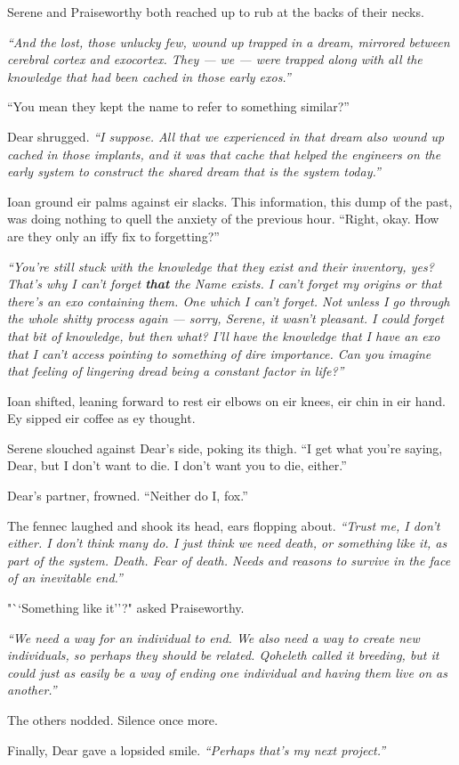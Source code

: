 Serene and Praiseworthy both reached up to rub at the backs of their necks.

\emph{``And the lost, those unlucky few, wound up trapped in a dream, mirrored between cerebral cortex and exocortex. They — we — were trapped along with all the knowledge that had been cached in those early exos.''}

``You mean they kept the name to refer to something similar?''

Dear shrugged. \emph{``I suppose. All that we experienced in that dream also wound up cached in those implants, and it was that cache that helped the engineers on the early system to construct the shared dream that is the system today.''}

Ioan ground eir palms against eir slacks. This information, this dump of the past, was doing nothing to quell the anxiety of the previous hour. ``Right, okay. How are they only an iffy fix to forgetting?''

\emph{``You're still stuck with the knowledge that they exist and their inventory, yes? That's why I can't forget \textbf{that} the Name exists. I can't forget my origins or that there's an exo containing them. One which I can't forget. Not unless I go through the whole shitty process again — sorry, Serene, it wasn't pleasant. I could forget that bit of knowledge, but then what? I'll have the knowledge that I have an exo that I can't access pointing to something of dire importance. Can you imagine that feeling of lingering dread being a constant factor in life?''}

Ioan shifted, leaning forward to rest eir elbows on eir knees, eir chin in eir hand. Ey sipped eir coffee as ey thought.

Serene slouched against Dear's side, poking its thigh. ``I get what you're saying, Dear, but I don't want to die. I don't want you to die, either.''

Dear's partner, frowned. ``Neither do I, fox.''

The fennec laughed and shook its head, ears flopping about. \emph{``Trust me, I don't either. I don't think many do. I just think we need death, or something like it, as part of the system. Death. Fear of death. Needs and reasons to survive in the face of an inevitable end.''}

"``Something like it''?" asked Praiseworthy.

\emph{``We need a way for an individual to end. We also need a way to create new individuals, so perhaps they should be related. Qoheleth called it breeding, but it could just as easily be a way of ending one individual and having them live on as another.''}

The others nodded. Silence once more.

Finally, Dear gave a lopsided smile. \emph{``Perhaps that's my next project.''}
